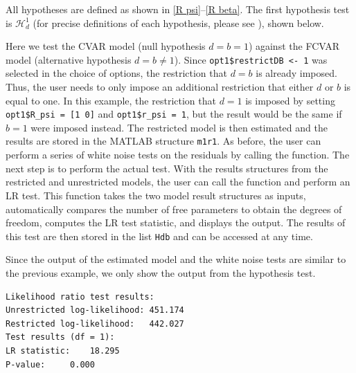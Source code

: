 \documentclass[article]{jss}
\newcommand{\fct}[1]{\code{#1()}}
\begin{document}
All hypotheses are defined as shown in \eqref{R psi}--\eqref{R beta}. The first hypothesis test is $\mathscr{H}_d^1$ (for precise definitions of each hypothesis, please see \cite{JNP2014}), 
shown below. 


Here we test the CVAR model (null hypothesis $d=b=1$) against the FCVAR model (alternative hypothesis $d=b$). Since \verb|opt1$restrictDB <- 1| was selected in the choice of options,
the restriction that $d=b$ is already imposed. Thus, the user needs to only impose an additional restriction that either $d$ or $b$ is equal to one. In this example, the restriction that $d=1$ is imposed by setting \verb|opt1$R_psi = [1 0]| and \verb|opt1$r_psi = 1|, but the result would be the same if $b=1$ were imposed instead. The restricted model is then estimated and the results are stored in the MATLAB structure \verb|m1r1|. As before, the user can perform a series of white noise tests on the residuals by calling the \fct{MVWNtest} function. The next step is to perform the actual test. With the results structures from the restricted and unrestricted models, the user can call the function \fct{HypoTest} and perform an LR test. This function takes the two model result structures as inputs, automatically compares the number of free parameters to obtain the degrees of freedom, computes the LR test statistic, and displays the output. The results of this test are then stored in the list \verb|Hdb| and can be accessed at any time.

Since the output of the estimated model and the white noise tests are similar to the previous example, we only show the output from the hypothesis test. 

\begin{verbatim}
Likelihood ratio test results:
Unrestricted log-likelihood: 451.174
Restricted log-likelihood:   442.027
Test results (df = 1):
LR statistic: 	 18.295
P-value: 	 0.000
\end{verbatim}
\end{document}
